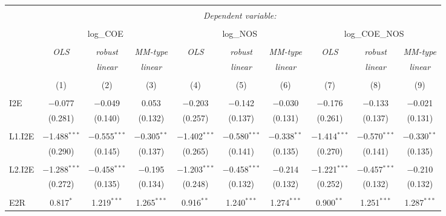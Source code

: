 
\begin{table}[!htbp] \centering 
  \caption{} 
  \label{} 
\begin{tabular}{@{\extracolsep{5pt}}lccccccccc} 
\\[-1.8ex]\hline 
\hline \\[-1.8ex] 
 & \multicolumn{9}{c}{\textit{Dependent variable:}} \\ 
\cline{2-10} 
\\[-1.8ex] & \multicolumn{3}{c}{log\_COE} & \multicolumn{3}{c}{log\_NOS} & \multicolumn{3}{c}{log\_COE\_NOS} \\ 
\\[-1.8ex] & \textit{OLS} & \textit{robust} & \textit{MM-type} & \textit{OLS} & \textit{robust} & \textit{MM-type} & \textit{OLS} & \textit{robust} & \textit{MM-type} \\ 
 & \textit{} & \textit{linear} & \textit{linear} & \textit{} & \textit{linear} & \textit{linear} & \textit{} & \textit{linear} & \textit{linear} \\ 
\\[-1.8ex] & (1) & (2) & (3) & (4) & (5) & (6) & (7) & (8) & (9)\\ 
\hline \\[-1.8ex] 
 I2E & $-$0.077 & $-$0.049 & 0.053 & $-$0.203 & $-$0.142 & $-$0.030 & $-$0.176 & $-$0.133 & $-$0.021 \\ 
  & (0.281) & (0.140) & (0.132) & (0.257) & (0.137) & (0.131) & (0.261) & (0.137) & (0.131) \\ 
  & & & & & & & & & \\ 
 L1.I2E & $-$1.488$^{***}$ & $-$0.555$^{***}$ & $-$0.305$^{**}$ & $-$1.402$^{***}$ & $-$0.580$^{***}$ & $-$0.338$^{**}$ & $-$1.414$^{***}$ & $-$0.570$^{***}$ & $-$0.330$^{**}$ \\ 
  & (0.290) & (0.145) & (0.137) & (0.265) & (0.141) & (0.135) & (0.270) & (0.141) & (0.135) \\ 
  & & & & & & & & & \\ 
 L2.I2E & $-$1.288$^{***}$ & $-$0.458$^{***}$ & $-$0.195 & $-$1.203$^{***}$ & $-$0.458$^{***}$ & $-$0.214 & $-$1.221$^{***}$ & $-$0.457$^{***}$ & $-$0.210 \\ 
  & (0.272) & (0.135) & (0.134) & (0.248) & (0.132) & (0.132) & (0.252) & (0.132) & (0.132) \\ 
  & & & & & & & & & \\ 
 E2R & 0.817$^{*}$ & 1.219$^{***}$ & 1.265$^{***}$ & 0.916$^{**}$ & 1.240$^{***}$ & 1.274$^{***}$ & 0.900$^{**}$ & 1.251$^{***}$ & 1.287$^{***}$ \\ 

\end{tabular}
\end{table}
